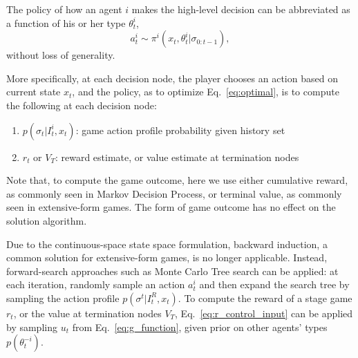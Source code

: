 \documentclass[letterpaper, 10 pt, conference]{ieeeconf}  %
\begin{document}
The policy of how an agent $i$ makes the high-level decision can be 
abbreviated as a function of his or her type $\theta^i_t$,
\begin{equation}
a^i_t \sim \pi^i(x_t,\theta^i_t|\sigma_{0:t-1}),
\end{equation}
without loss of generality.

More specifically, at each decision node, the player chooses an action based on current state $x_t$, and the policy, as to optimize Eq.~\ref{eq:optimal}, is to 
compute the following at each decision node:
\begin{enumerate}
  \item $p(\sigma_{t}|I^i_t,x_t)$: game action profile probability given history set
  \item $r_{t}$ or $V_T$: 
    reward estimate, or value estimate at termination nodes
\end{enumerate}
Note that, to compute the game outcome, here we use either cumulative reward, as 
commonly seen in Markov Decision Process, or terminal value, as commonly seen 
in extensive-form games. The form of game outcome has no effect on the 
solution algorithm.  

Due to the continuous-space state space formulation, backward induction, a common 
solution for extensive-form games, is no longer applicable. Instead, 
forward-search approaches such as Monte Carlo Tree search can be applied: at 
each iteration, randomly sample an action $a^i_t$ and then expand the search 
tree by sampling the action profile 
$p(\sigma^t|I^R_t,x_t)$. To 
compute the reward of a stage game $r_t$, or the value at termination nodes $V_T$, Eq.~\ref{eq:r_control_input} can be applied by sampling $u_t$ from 
Eq.~\ref{eq:g_function}, given prior on other agents' types $p(\theta^{-i}_t)$. 
\vspace{-.2em}
\end{document}
